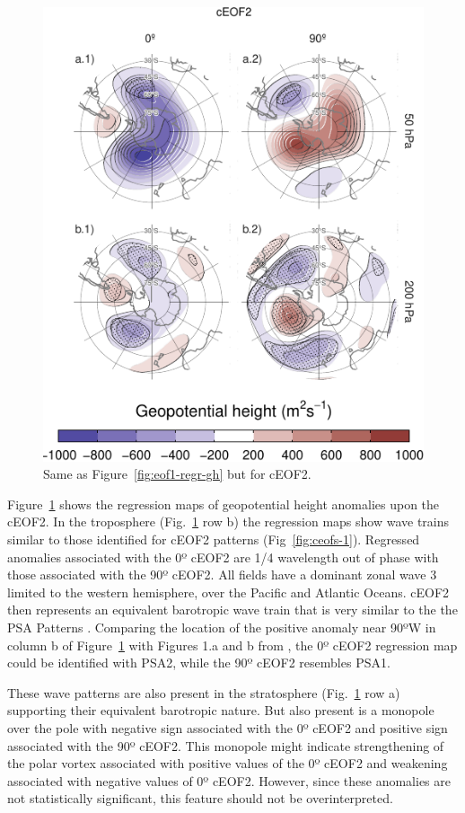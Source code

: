 \documentclass[pdflatex,sn-basic]{sn-jnl}
\theoremstyle{thmstyleone}%
\theoremstyle{thmstyletwo}%
\theoremstyle{thmstylethree}%
\begin{document}
\begin{figure}
\centering
\includegraphics{../figures/eof2-regr-gh-1.pdf}
\caption{\label{fig:eof2-regr-gh}Same as Figure~\ref{fig:eof1-regr-gh} but for cEOF2.}
\end{figure}

Figure~\ref{fig:eof2-regr-gh} shows the regression maps of geopotential height anomalies upon the cEOF2.
In the troposphere (Fig.~\ref{fig:eof2-regr-gh} row b) the regression maps show wave trains similar to those identified for cEOF2 patterns (Fig~\ref{fig:ceofs-1}).
Regressed anomalies associated with the 0º cEOF2 are 1/4 wavelength out of phase with those associated with the 90º cEOF2.
All fields have a dominant zonal wave 3 limited to the western hemisphere, over the Pacific and Atlantic Oceans.
cEOF2 then represents an equivalent barotropic wave train that is very similar to the the PSA Patterns \citep{mo2001}.
Comparing the location of the positive anomaly near 90ºW in column b of Figure~\ref{fig:eof2-regr-gh} with Figures 1.a and b from \citet{mo2001}, the 0º cEOF2 regression map could be identified with PSA2, while the 90º cEOF2 resembles PSA1.

These wave patterns are also present in the stratosphere (Fig.~\ref{fig:eof2-regr-gh} row a) supporting their equivalent barotropic nature.
But also present is a monopole over the pole with negative sign associated with the 0º cEOF2 and positive sign associated with the 90º cEOF2.
This monopole might indicate strengthening of the polar vortex associated with positive values of the 0º cEOF2 and weakening associated with negative values of 0º cEOF2.
However, since these anomalies are not statistically significant, this feature should not be overinterpreted.
\end{document}
